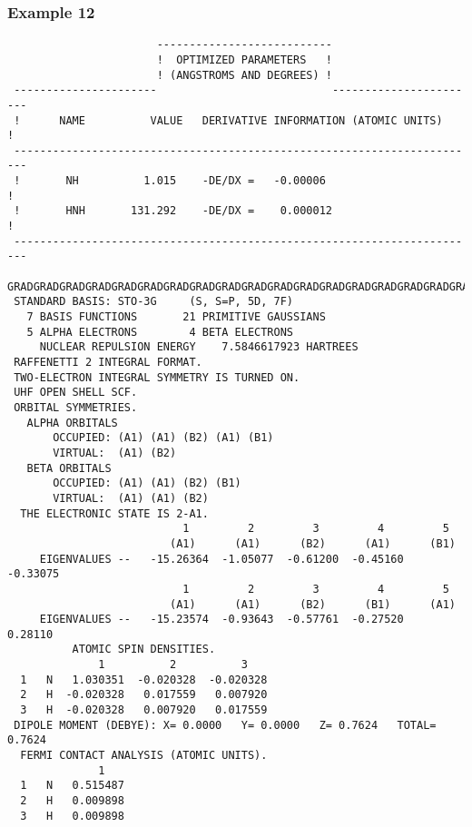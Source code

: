 \subsubsection{\sf Example 12}
{\small
\begin{verbatim}
                       ---------------------------
                       !  OPTIMIZED PARAMETERS   !
                       ! (ANGSTROMS AND DEGREES) !
 ----------------------                           -----------------------
 !      NAME          VALUE   DERIVATIVE INFORMATION (ATOMIC UNITS)     !
 ------------------------------------------------------------------------
 !       NH          1.015    -DE/DX =   -0.00006                       !
 !       HNH       131.292    -DE/DX =    0.000012                      !
 ------------------------------------------------------------------------
 GRADGRADGRADGRADGRADGRADGRADGRADGRADGRADGRADGRADGRADGRADGRADGRADGRADGRAD
 STANDARD BASIS: STO-3G     (S, S=P, 5D, 7F)
   7 BASIS FUNCTIONS       21 PRIMITIVE GAUSSIANS
   5 ALPHA ELECTRONS        4 BETA ELECTRONS
     NUCLEAR REPULSION ENERGY    7.5846617923 HARTREES
 RAFFENETTI 2 INTEGRAL FORMAT.
 TWO-ELECTRON INTEGRAL SYMMETRY IS TURNED ON.
 UHF OPEN SHELL SCF.
 ORBITAL SYMMETRIES.
   ALPHA ORBITALS
       OCCUPIED: (A1) (A1) (B2) (A1) (B1)
       VIRTUAL:  (A1) (B2)
   BETA ORBITALS
       OCCUPIED: (A1) (A1) (B2) (B1)
       VIRTUAL:  (A1) (A1) (B2)
  THE ELECTRONIC STATE IS 2-A1.
                           1         2         3         4         5
                         (A1)      (A1)      (B2)      (A1)      (B1)
     EIGENVALUES --   -15.26364  -1.05077  -0.61200  -0.45160  -0.33075
                           1         2         3         4         5
                         (A1)      (A1)      (B2)      (B1)      (A1)
     EIGENVALUES --   -15.23574  -0.93643  -0.57761  -0.27520   0.28110
          ATOMIC SPIN DENSITIES.
              1          2          3
  1   N   1.030351  -0.020328  -0.020328
  2   H  -0.020328   0.017559   0.007920
  3   H  -0.020328   0.007920   0.017559
 DIPOLE MOMENT (DEBYE): X= 0.0000   Y= 0.0000   Z= 0.7624   TOTAL= 0.7624
  FERMI CONTACT ANALYSIS (ATOMIC UNITS).
              1
  1   N   0.515487
  2   H   0.009898
  3   H   0.009898
\end{verbatim}
}
\newpage
